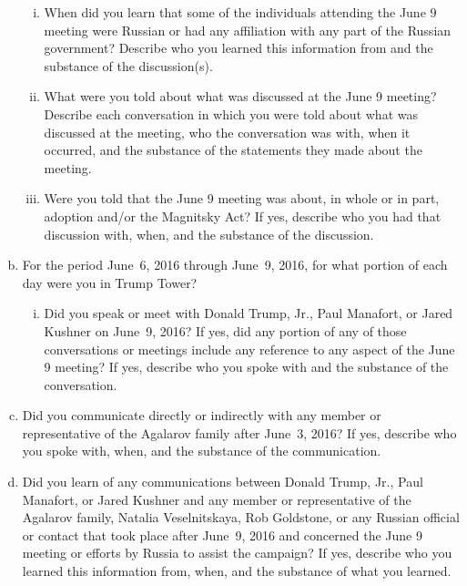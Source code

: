 \begin{enumerate}[a.]
\begin{enumerate}[i.]
\item When did you learn that some of the individuals attending the June 9 meeting were Russian or had any affiliation with any part of the Russian government?
Describe who you learned this information from and the substance of the discussion(s).

\item What were you told about what was discussed at the June 9 meeting?
Describe each conversation in which you were told about what was discussed at the meeting, who the conversation was with, when it occurred, and the substance of the statements they made about the meeting.

\item Were you told that the June 9 meeting was about, in whole or in part, adoption and/or the Magnitsky Act?
If yes, describe who you had that discussion with, when, and the substance of the discussion.

\end{enumerate}

\item For the period June~6, 2016 through June~9, 2016, for what portion of each day were you in Trump Tower?

\begin{enumerate}[i.]

\item Did you speak or meet with Donald Trump, Jr., Paul Manafort, or Jared Kushner on June~9, 2016?
If yes, did any portion of any of those conversations or meetings include any reference to any aspect of the June 9 meeting?
If yes, describe who you spoke with and the substance of the conversation.

\end{enumerate}

\item Did you communicate directly or indirectly with any member or representative of the Agalarov family after June~3, 2016?
If yes, describe who you spoke with, when, and the substance of the communication.

\item Did you learn of any communications between Donald Trump, Jr., Paul Manafort, or Jared Kushner and any member or representative of the Agalarov family, Natalia Veselnitskaya, Rob Goldstone, or any Russian official or contact that took place after June~9, 2016 and concerned the June 9 meeting or efforts by Russia to assist the campaign?
If yes, describe who you learned this information from, when, and the substance of what you learned.


\end{enumerate}
